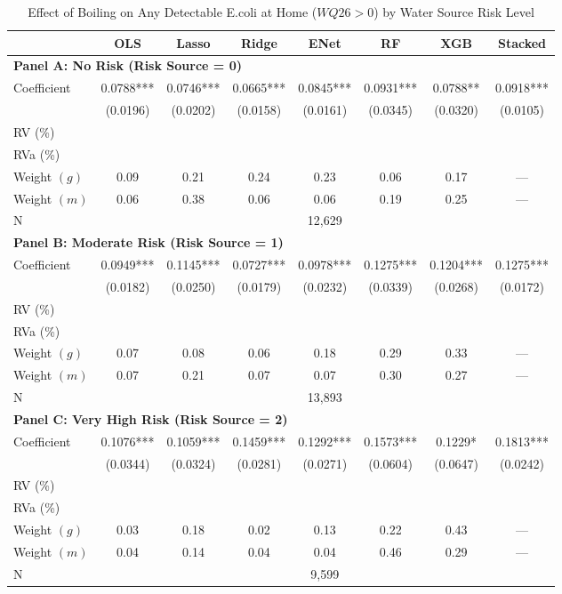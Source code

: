 \begin{table}[htbp]
\centering
\caption{Effect of Boiling on Any Detectable E.coli at Home ($WQ26>0$) by Water Source Risk Level}
\label{tab:some_risk_home_subgroups}
\begin{tabular}{lccccccc}
\toprule
 & OLS & Lasso & Ridge & ENet & RF & XGB & Stacked \\
\midrule
\multicolumn{8}{l}{\textbf{Panel A: No Risk (Risk Source = 0)}} \\
\midrule
Coefficient & 0.0788*** & 0.0746*** & 0.0665*** & 0.0845*** & 0.0931*** & 0.0788** & 0.0918*** \\
 & (0.0196) & (0.0202) & (0.0158) & (0.0161) & (0.0345) & (0.0320) & (0.0105) \\
RV (\%) \\
RVa (\%) \\
Weight $(g)$ & 0.09 & 0.21 & 0.24 & 0.23 & 0.06 & 0.17 & — \\
Weight $(m)$ & 0.06 & 0.38 & 0.06 & 0.06 & 0.19 & 0.25 & — \\
N & \multicolumn{7}{c}{12,629} \\

\multicolumn{8}{l}{\textbf{Panel B: Moderate Risk (Risk Source = 1)}} \\
\midrule
Coefficient & 0.0949*** & 0.1145*** & 0.0727*** & 0.0978*** & 0.1275*** & 0.1204*** & 0.1275*** \\
 & (0.0182) & (0.0250) & (0.0179) & (0.0232) & (0.0339) & (0.0268) & (0.0172) \\
RV (\%) \\
RVa (\%) \\
Weight $(g)$ & 0.07 & 0.08 & 0.06 & 0.18 & 0.29 & 0.33 & — \\
Weight $(m)$ & 0.07 & 0.21 & 0.07 & 0.07 & 0.30 & 0.27 & — \\
N & \multicolumn{7}{c}{13,893} \\

\multicolumn{8}{l}{\textbf{Panel C: Very High Risk (Risk Source = 2)}} \\
\midrule
Coefficient & 0.1076*** & 0.1059*** & 0.1459*** & 0.1292*** & 0.1573*** & 0.1229* & 0.1813*** \\
 & (0.0344) & (0.0324) & (0.0281) & (0.0271) & (0.0604) & (0.0647) & (0.0242) \\
RV (\%) \\
RVa (\%) \\
Weight $(g)$ & 0.03 & 0.18 & 0.02 & 0.13 & 0.22 & 0.43 & — \\
Weight $(m)$ & 0.04 & 0.14 & 0.04 & 0.04 & 0.46 & 0.29 & — \\
N & \multicolumn{7}{c}{9,599} \\


\end{tabular}
\end{table}
